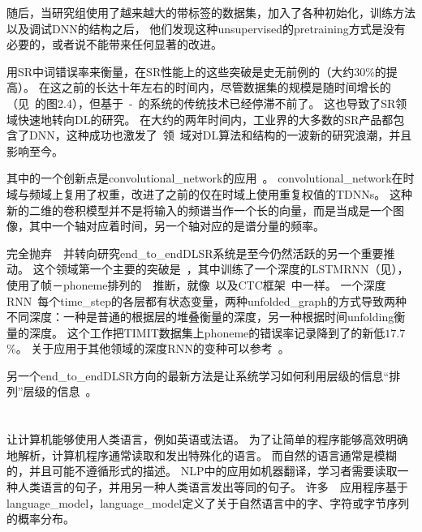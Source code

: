 随后，当研究组使用了越来越大的带标签的数据集，加入了各种初始化，训练方法以及调试\gls{DNN}的结构之后，
他们发现这种\gls{unsupervised}的\gls{pretraining}方式是没有必要的，或者说不能带来任何显著的改进。

用\gls{SR}中词错误率来衡量，在\gls{SR}性能上的这些突破是史无前例的（大约$30$\%的提高）。
在这之前的长达十年左右的时间内，尽管数据集的规模是随时间增长的（见~\citet{Deng+Yu-2014}的图2.4），但基于~-~的系统的传统技术已经停滞不前了。
这也导致了\gls{SR}领域快速地转向\gls{DL}的研究。
在大约的两年时间内，工业界的大多数的\gls{SR}产品都包含了\gls{DNN}，这种成功也激发了~领~域对\gls{DL}算法和结构的一波新的研究浪潮，并且影响至今。

其中的一个创新点是\gls{convolutional_network}的应用~\citep{Sainath-et-al-ICASSP2013}。
\gls{convolutional_network}在时域与频域上复用了权重，改进了之前的仅在时域上使用重复权值的\gls{TDNNs}。
这种新的二维的卷积模型并不是将输入的频谱当作一个长的向量，而是当成是一个图像，其中一个轴对应着时间，另一个轴对应的是谱分量的频率。

完全抛弃~~并转向研究\gls{end_to_end}\gls{DL}\gls{SR}系统是至今仍然活跃的另一个重要推动。
这个领域第一个主要的突破是~\citet{Graves-et-al-ICASSP2013}，其中训练了一个深度的\gls{LSTM}\gls{RNN}（见），使用了帧－\gls{phoneme}排列的~~推断，就像~\citet{LeCun98-small}以及CTC框架~\citep{Graves-et-al-2006,Graves-book2012}中一样。
一个深度\gls{RNN}~\citep{Graves-et-al-ICASSP2013}每个\gls{time_step}的各层都有状态变量，两种\gls{unfolded_graph}的方式导致两种不同深度：一种是普通的根据层的堆叠衡量的深度，另一种根据时间\gls{unfolding}衡量的深度。
这个工作把TIMIT数据集上\gls{phoneme}的错误率记录降到了的新低$17.7$\%。
关于应用于其他领域的深度\gls{RNN}的变种可以参考~\citet{Pascanu-et-al-ICLR2014,Chung-et-al-NIPSDL2014-small}。

另一个\gls{end_to_end}\gls{DL}\gls{SR}方向的最新方法是让系统学习如何利用层级的信息``排列''层级的信息~\citep{Chorowski-et-al-arxiv2014,llu_is2015b}。


\section{}
\label{sec: natural_language_processing}

让计算机能够使用人类语言，例如英语或法语。
为了让简单的程序能够高效明确地解析，计算机程序通常读取和发出特殊化的语言。
而自然的语言通常是模糊的，并且可能不遵循形式的描述。
\gls{NLP}中的应用如机器翻译，学习者需要读取一种人类语言的句子，并用另一种人类语言发出等同的句子。
许多~~应用程序基于\gls{language_model}，\gls{language_model}定义了关于自然语言中的字、字符或字节序列的概率分布。

